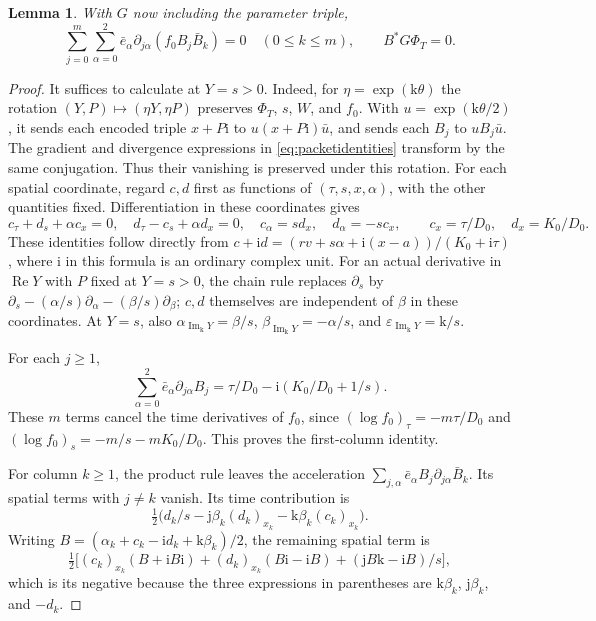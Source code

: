 \documentclass[11pt]{article}
\newtheorem{lemma}{Lemma}
\numberwithin{equation}{section}
\newcommand{\Rea}{\operatorname{Re}}
\begin{document}
\begin{lemma}\label{lem:packets}
With $G$ now including the parameter triple,
\begin{equation}\label{eq:packetidentities}
 \sum_{j=0}^m\sum_{\alpha=0}^2
       \bar e_\alpha\partial_{j\alpha}(f_0B_j\bar B_k)=0
       \quad(0\le k\le m),\qquad B^*G\Phi_T=0.
\end{equation}
\end{lemma}
\begin{proof}
It suffices to calculate at $Y=s>0$.
Indeed, for $\eta=\exp(\mathrm{k}\theta)$ the rotation
$(Y,P)\mapsto(\eta Y,\eta P)$ preserves $\Phi_T$, $s$, $W$, and $f_0$.
With $u=\exp(\mathrm{k}\theta/2)$, it sends each encoded triple
$x+P\mathrm{i}$ to $u(x+P\mathrm{i})\bar u$, and sends each $B_j$
to $uB_j\bar u$. The gradient and divergence expressions in
\eqref{eq:packetidentities} transform by the same conjugation.
Thus their vanishing is preserved under this rotation.
For each spatial coordinate, regard $c,d$ first as functions of
$(\tau,s,x,\alpha)$, with the other quantities fixed.
Differentiation in these coordinates gives
\[
 c_\tau+d_s+\alpha c_x=0,\quad
 d_\tau-c_s+\alpha d_x=0,\quad
 c_\alpha=sd_x,\quad d_\alpha=-sc_x,
 \qquad c_x=\tau/D_0,\quad d_x=K_0/D_0.
\]
These identities follow directly from
$c+\mathrm i d=(rv+s\alpha+\mathrm i(x-a))/(K_0+\mathrm i\tau)$,
where $\mathrm i$ in this formula is an ordinary complex unit.
For an actual derivative in $\Rea Y$ with $P$ fixed at $Y=s>0$,
the chain rule replaces $\partial_s$ by
$\partial_s-(\alpha/s)\partial_\alpha-(\beta/s)\partial_\beta$;
$c,d$ themselves are independent of $\beta$ in these coordinates.
At $Y=s$, also
$\alpha_{\operatorname{Im}_{\mathrm{k}}Y}=\beta/s$,
$\beta_{\operatorname{Im}_{\mathrm{k}}Y}=-\alpha/s$, and
$\varepsilon_{\operatorname{Im}_{\mathrm{k}}Y}=\mathrm{k}/s$.

For each $j\ge1$,
\[
 \sum_{\alpha=0}^2\bar e_\alpha\partial_{j\alpha}B_j
   =\tau/D_0-\mathrm{i}(K_0/D_0+1/s).
\]
These $m$ terms cancel the time derivatives of $f_0$, since
$(\log f_0)_\tau=-m\tau/D_0$ and
$(\log f_0)_s=-m/s-mK_0/D_0$.
This proves the first-column identity.

For column $k\ge1$, the product rule leaves the acceleration
$\sum_{j,\alpha}\bar e_\alpha B_j\partial_{j\alpha}\bar B_k$.
Its spatial terms with $j\ne k$ vanish.
Its time contribution is
\[
 \tfrac12\big(d_k/s-\mathrm{j}\beta_k(d_k)_{x_k}
                         -\mathrm{k}\beta_k(c_k)_{x_k}\big).
\]
Writing $B=(\alpha_k+c_k-\mathrm{i} d_k+\mathrm{k}\beta_k)/2$,
the remaining spatial term is
\[
 \tfrac12\big[(c_k)_{x_k}(B+\mathrm{i} B\mathrm{i})
 +(d_k)_{x_k}(B\mathrm{i}-\mathrm{i} B)
 +(\mathrm{j}B\mathrm{k}-\mathrm{i} B)/s\big],
\]
which is its negative because the three expressions in parentheses
are $\mathrm{k}\beta_k$, $\mathrm{j}\beta_k$, and $-d_k$.


\end{proof}
\end{document}
